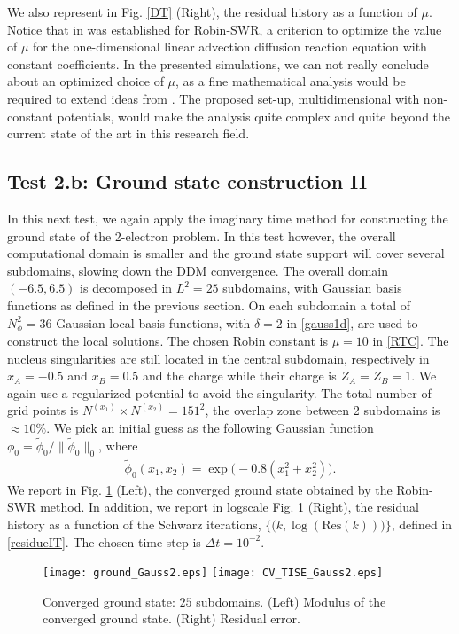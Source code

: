 We also represent in Fig. \ref{DT} (Right), the residual history as a function of $\mu$. Notice that in \cite{halpern3} was established for Robin-SWR, a criterion to optimize the value of $\mu$ for the one-dimensional linear advection diffusion reaction equation  with constant coefficients. In the presented simulations, we can not really conclude about an optimized choice of $\mu$, as a fine mathematical analysis would be required to extend ideas from \cite{halpern3}. The proposed set-up, multidimensional with non-constant potentials, would make the analysis quite complex and quite beyond the current state of the art in this research field.
\subsection{Test 2.b: Ground state construction II}\label{testB}
In this next test, we again apply the imaginary time method for constructing the ground state of the 2-electron problem. In this test however, the overall computational domain is smaller and the ground state support will cover several subdomains, slowing down the DDM convergence. The overall domain $(-6.5,6.5)$ is decomposed in $L^2=25$ subdomains, with Gaussian basis functions as defined in the previous section. On each subdomain a total of $N_{\phi}^2=36$ Gaussian local basis functions, with $\delta=2$ in \eqref{gauss1d}, are used to construct the local solutions. The chosen Robin constant is $\mu=10$  in \eqref{RTC}.  The nucleus singularities are still located in the central subdomain, respectively in $x_A=-0.5$ and $x_B=0.5$ and the charge while their charge is $Z_A=Z_B=1$. We again use a regularized potential to avoid the singularity. The total number of grid points is $N^{(x_1)}\times N^{(x_2)}=151^2$, the overlap zone between 2 subdomains is $\approx 10\%$. We pick an initial guess as the following Gaussian function $\phi_0=\widetilde{\phi}_0/\|\widetilde{\phi}_0\|_0$, where
\begin{eqnarray*}
\widetilde{\phi}_0(x_1,x_2) = \exp\big(-0.8(x_1^2+x_2^2)\big).
\end{eqnarray*}
We report in Fig. \ref{ground_Gauss2} (Left), the converged ground state obtained by the Robin-SWR method. In addition, we report in logscale Fig. \ref{ground_Gauss2} (Right), the residual history as a function of the Schwarz iterations, $\big\{\big(k,\log(\textrm{Res}(k))\big)\big\}$, defined in \eqref{residueIT}. The chosen time step is $\Delta t=10^{-2}$.
\begin{figure}[!ht]
\begin{center}
\hspace*{1mm}\texttt{[image: ground\_Gauss2.eps]}
\hspace*{1mm}\texttt{[image: CV\_TISE\_Gauss2.eps]}
\caption{Converged ground state: $25$ subdomains. (Left) Modulus of the converged ground state. (Right) Residual error.}
\label{ground_Gauss2}
\end{center}
\end{figure}
